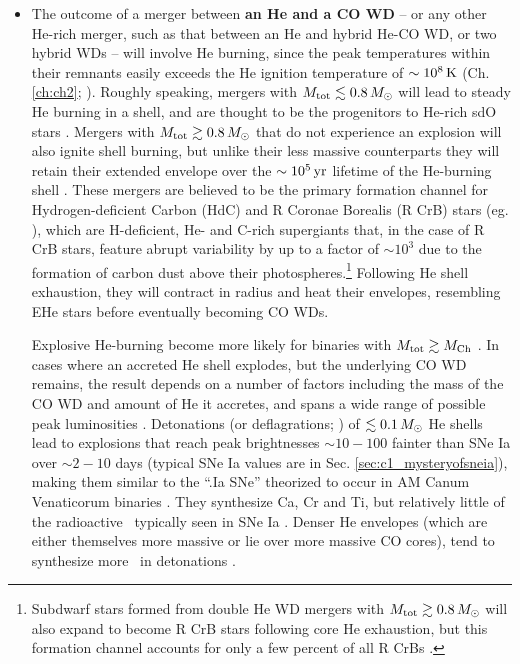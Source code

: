 \begin{itemize}
	\item The outcome of a merger between {\bf an He and a CO WD} -- {\charles or any other He-rich merger, such as that between an He and hybrid He-CO WD, or two hybrid WDs -- will involve He burning, since the peak temperatures within their remnants easily exceeds the He ignition temperature of $\sim10^8\,\mathrm{K}$ (Ch. \ref{ch:ch2}; \citep{dan+14}).}  Roughly speaking, mergers with $\Mtot \lesssim 0.8\,\Msun$ will lead to steady He burning in a shell, and are thought to be the progenitors to He-rich sdO stars \citep{justph11}.  Mergers with $\Mtot \gtrsim 0.8\,\Msun$ that do not experience an explosion will also ignite shell burning, but unlike their less massive counterparts they will retain their extended envelope {\charles over the $\sim10^5\,\mathrm{yr}$ lifetime} of the He-burning shell \citep{ibent85, zhanj12b}.  These mergers are believed to be the primary formation channel for Hydrogen-deficient Carbon (HdC) and R Coronae Borealis (R CrB) stars (eg. \citealt{webb84, ibent84, saioj02, clay12, zhan+14}), which are H-deficient, He- and C-rich supergiants that, in the case of R CrB stars, feature abrupt variability by up to a factor of $\sim10^3$ due to the formation of carbon dust above their photospheres.\footnote{Subdwarf stars formed from double He WD mergers with $\Mtot \gtrsim 0.8\,\Msun$ will also expand to become R CrB stars following core He exhaustion, but this formation channel accounts for only a few percent of all R CrBs \citep{zhanj12b}.}  Following He shell exhaustion, they will contract in radius and heat their envelopes, resembling EHe stars \citep{saioj02, jeff14} before eventually becoming CO WDs.

Explosive He-burning become more likely for binaries with $\Mtot\gtrsim\Mch$ \citep{dan+12, dan+14}.  In cases where an accreted He shell explodes, but the underlying CO WD remains, the result depends on a number of factors including the mass of the CO WD and amount of He it accretes, and spans a wide range of possible peak luminosities \citep{shen+10he, wald+11, woosk11}.  Detonations (or deflagrations; \citealt{woosk11}) of $\lesssim0.1\,\Msun$ He shells lead to explosions that reach peak brightnesses $\sim10-100$ fainter than SNe Ia over $\sim2-10$ days (typical SNe Ia values are in Sec. \ref{sec:c1_mysteryofsneia}), making them similar to the ``.Ia SNe'' theorized to occur in AM Canum Venaticorum binaries \citep{bild+07}.  They synthesize Ca, Cr and Ti, but relatively little of the radioactive \Ni\ typically seen in SNe Ia \citep{shen+10he, woosk11, wald+11}.  Denser He envelopes (which are either themselves more massive or lie over more massive CO cores), tend to synthesize more \Ni\ in detonations \citep{shen+10he, wald+11}. 


\end{itemize}
